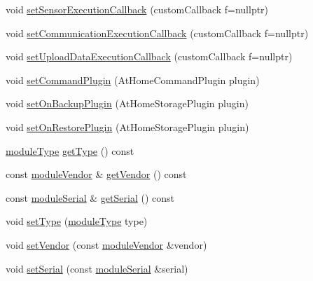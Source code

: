 \begin{DoxyCompactItemize}
\item 
void \mbox{\hyperlink{classathome_1_1module_1_1_at_home_module_a29464ea78833e571a589c0cf0d17321b}{set\+Sensor\+Execution\+Callback}} (custom\+Callback f=nullptr)
\item 
void \mbox{\hyperlink{classathome_1_1module_1_1_at_home_module_a8c3585c35b11fe5b70438678b54f3970}{set\+Communication\+Execution\+Callback}} (custom\+Callback f=nullptr)
\item 
void \mbox{\hyperlink{classathome_1_1module_1_1_at_home_module_a24130398678c98c500e211b676fa5079}{set\+Upload\+Data\+Execution\+Callback}} (custom\+Callback f=nullptr)
\item 
void \mbox{\hyperlink{classathome_1_1module_1_1_at_home_module_aa5d7be373ec60debac614544ae91a648}{set\+Command\+Plugin}} (At\+Home\+Command\+Plugin plugin)
\item 
void \mbox{\hyperlink{classathome_1_1module_1_1_at_home_module_af7e6ed7d4dc72c0cef209704fab0e3af}{set\+On\+Backup\+Plugin}} (At\+Home\+Storage\+Plugin plugin)
\item 
void \mbox{\hyperlink{classathome_1_1module_1_1_at_home_module_ae359941a4f2e571a052a30916a306e48}{set\+On\+Restore\+Plugin}} (At\+Home\+Storage\+Plugin plugin)
\item 
\mbox{\hyperlink{classathome_1_1module_1_1_at_home_module_a5075522baeaab0de681c26a5e5f18cd3}{module\+Type}} \mbox{\hyperlink{classathome_1_1module_1_1_at_home_module_a1d79645c2471440383fa935b48264d89}{get\+Type}} () const
\item 
const \mbox{\hyperlink{classathome_1_1module_1_1_at_home_module_a90432f050114b268f7f7e0598dd8c9ac}{module\+Vendor}} \& \mbox{\hyperlink{classathome_1_1module_1_1_at_home_module_ad96c0feb4eacedf3e3fa9383a53cd7f7}{get\+Vendor}} () const
\item 
const \mbox{\hyperlink{classathome_1_1module_1_1_at_home_module_aff47a5cb8ee94041eb42fa673dea7a81}{module\+Serial}} \& \mbox{\hyperlink{classathome_1_1module_1_1_at_home_module_a783ba85ff4b0c77e67073342cfdae82c}{get\+Serial}} () const
\item 
void \mbox{\hyperlink{classathome_1_1module_1_1_at_home_module_a2f9255b84d9661f7825aca39936f61f1}{set\+Type}} (\mbox{\hyperlink{classathome_1_1module_1_1_at_home_module_a5075522baeaab0de681c26a5e5f18cd3}{module\+Type}} type)
\item 
void \mbox{\hyperlink{classathome_1_1module_1_1_at_home_module_a9fdaf9bb63d3229bf3135d5e0d21b74c}{set\+Vendor}} (const \mbox{\hyperlink{classathome_1_1module_1_1_at_home_module_a90432f050114b268f7f7e0598dd8c9ac}{module\+Vendor}} \&vendor)
\item 
void \mbox{\hyperlink{classathome_1_1module_1_1_at_home_module_a1acd0195c09c974ec52d5c74a9b7ede8}{set\+Serial}} (const \mbox{\hyperlink{classathome_1_1module_1_1_at_home_module_aff47a5cb8ee94041eb42fa673dea7a81}{module\+Serial}} \&serial)
\end{DoxyCompactItemize}
